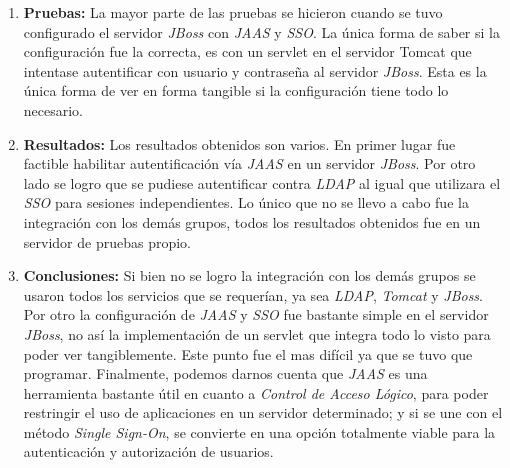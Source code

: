 
\begin{enumerate}

\item \textbf{Pruebas:} La mayor parte de las pruebas se hicieron cuando se tuvo configurado el
servidor \emph{JBoss} con \emph{JAAS} y \emph{SSO}. La única forma de saber si la configuración fue la correcta, es
con un servlet en el servidor Tomcat que intentase autentificar con usuario y contraseña al
servidor \emph{JBoss}. Esta es la única forma de ver en forma tangible si la configuración tiene todo lo necesario.

\item \textbf{Resultados:} Los resultados obtenidos son varios. En primer lugar fue factible
habilitar autentificación vía \emph{JAAS} en un servidor \emph{JBoss}. Por otro lado se logro que se pudiese
autentificar contra \emph{LDAP} al igual que utilizara el \emph{SSO} para sesiones independientes. Lo único
que no se llevo a cabo fue la integración con los demás grupos, todos los resultados obtenidos
fue en un servidor de pruebas propio.

\item \textbf{Conclusiones:} Si bien no se logro la integración con los demás grupos se usaron
todos los servicios que se requerían, ya sea \emph{LDAP}, \emph{Tomcat} y \emph{JBoss}. Por otro la configuración
de \emph{JAAS} y \emph{SSO} fue bastante simple en el servidor \emph{JBoss}, no así la implementación de un servlet
que integra todo lo visto para poder ver tangiblemente. Este punto fue el mas difícil ya que se
tuvo que programar. 
Finalmente, podemos darnos cuenta que \emph{JAAS} es una herramienta bastante útil en cuanto a
\emph{Control de Acceso Lógico}, para poder restringir el uso de aplicaciones en un servidor determinado;
y si se une con el método \emph{Single Sign-On}, se convierte en una opción totalmente viable para la autenticación
y autorización de usuarios.
\end{enumerate}
